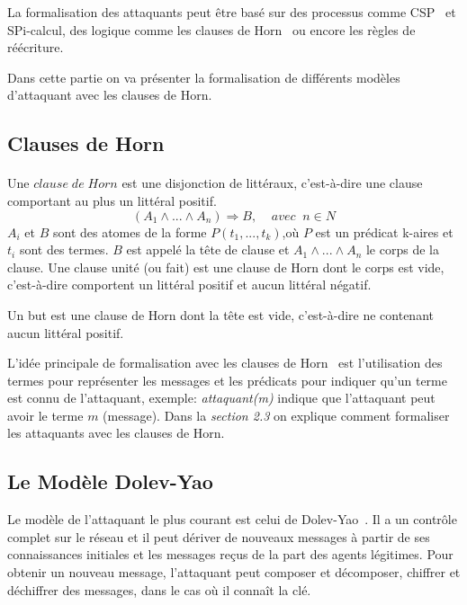 \documentclass[10pt,a4paper]{article}
\begin{document}
La formalisation des attaquants peut \^{e}tre basé sur des processus comme CSP~\cite{ref6} et SPi-calcul\cite{ref7}, des logique comme les clauses de Horn~\cite{ref2} ou encore les règles de réécriture.\newline  

Dans cette partie on va présenter la formalisation de différents modèles d'attaquant avec les clauses de Horn.   
\subsection{Clauses de Horn}
\paragraph{}
Une $clause\; de\; Horn$ est une disjonction de littéraux, c'est-à-dire une clause comportant au plus un littéral positif.  
\[(A_{1}\wedge...\wedge A_{n})\Rightarrow B ,\;\;\;\; avec\;\; n \in N  \]
$A_{i}$ et $B$ sont des atomes de la forme $P(t_{1},...,t_{k})$,où $P$ est un prédicat k-aires et $t_{i}$ sont des termes. $B$ est appelé la t\^{e}te de clause et $A_{1}\wedge...\wedge A_{n}$ le corps de la clause. Une clause unité (ou fait) est une clause de Horn dont le corps est vide, c'est-à-dire comportent un littéral positif et aucun littéral négatif.\newline

Un but est une clause de Horn dont la t\^{e}te est vide, c'est-à-dire ne contenant aucun littéral positif. 		    \newline

L'idée principale de formalisation avec les clauses de Horn~\cite{ref2} est l’utilisation des
termes pour représenter les messages et les prédicats pour indiquer qu'un terme est connu de l'attaquant, exemple: \textit{attaquant(m)} indique que l'attaquant peut avoir le terme $m$   (message). Dans la \textit{section 2.3} on explique comment formaliser les attaquants avec les clauses de Horn.

\subsection{Le Modèle Dolev-Yao}
Le modèle de l'attaquant le plus courant est celui de Dolev-Yao~\cite{ref3}. Il a un contr\^{o}le complet sur le réseau et il peut dériver de nouveaux messages à partir de ses connaissances initiales et les messages reçus de la part des agents légitimes. Pour obtenir un nouveau message, l'attaquant peut composer et décomposer, chiffrer et déchiffrer des messages, dans le cas o\`{u} il connaît la clé.\newline
\end{document}
